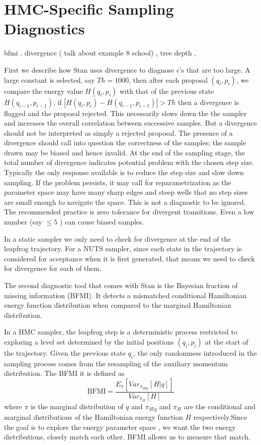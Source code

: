 \documentclass[12pt]{report}
\begin{document}
\section{HMC-Specific Sampling Diagnostics}
bfmi , divergence ( talk about example 8 school) , tree depth ,

First we describe how Stan uses
divergence to diagnose $\epsilon$'s that are too large. A large constant
is selected, say $Th = 1000$, then after each proposal $(q_i,p_i)$, we compare the
energy value $H(q_i,p_i)$ with that of the previous state $H(q_{i-1},p_{i-1})$,
if $|H(q_i,p_i) - H(q_{i-1},p_{i-1})|> Th$ then a divergence is flagged and the
proposal rejected. This necessarily slows down the the sampler and increases the overall correlation between successive samples. But a divergence should not be interpreted as simply a rejected proposal. The presence of a divergence should call into question the correctness of the samples; the sample
drawn may be biased and hence invalid.
 At the end of the sampling stage, the total number of
divergence indicates potential problem with the chosen step size. Typically the
only response available is to reduce the step size and slow down sampling.
If the problem persists, it may call for reparametrization as the parameter
space may have many sharp edges and steep wells that no step sizes are small
enough to navigate the space.  This is not a diagnostic to be ignored. The recommended practice is zero tolerance for divergent transitions. Even a low number (say $\le 5 $ ) can cause biased samples.

In a static sampler we only need to check for divergence at the end of the leapfrog trajectory. For a NUTS sampler, since each state in the trajectory is considered for acceptance when it is first generated, that means we need to check for divergence for each of them. 


The second diagnostic tool that comes with Stan is the Bayesian fraction of
missing information (BFMI). It detects a mismatched conditional Hamiltonian
energy function
distribution when compared to the marginal Hamiltonian distribution. 

In a HMC sampler, the leapfrog step is a deterministic process
restricted to exploring a level set determined by the 
initial positions $(q_i,p_i)$ at the start of the trajectory. Given the previous 
state $q_i$, the only randomness introduced in the sampling process comes from the resampling of the auxiliary
momentum distribution.  The BFMI it is defined as 
\[ \text{BFMI} = \frac{ E_\pi[Var_{\pi_{H|q}}[H|q]]}{Var_{\pi_H}[H]} \]
where $\pi$ is the marginal distribution of $q$ and $\pi_{H|q}$ and $\pi_{H}$
are the conditional and marginal distributions of the Hamiltonian energy
function $H$ respectively.Since the goal is
to explore the energy parameter space , we want the two energy distributions, 
closely match each other. BFMI allows us to measure that match.
\end{document}
